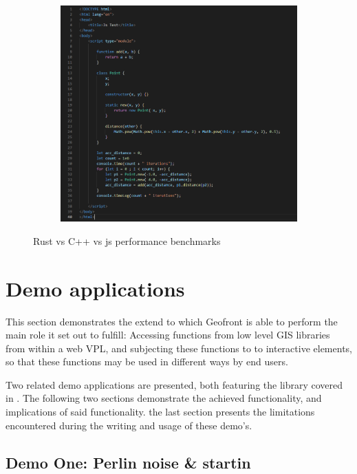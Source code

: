 \begin{figure}
\begin{subfigure}[b]{0.32\linewidth}
    \centering
    \includegraphics[width=\linewidth]{js.PNG}
    \caption{}
  \end{subfigure}%
  \caption[benchmark]{Rust vs C++ vs js performance benchmarks}
  \label{fig:perf-benchmark}
\end{figure}


\section{Demo applications}
\label{sec:testing:demo}
This section demonstrates the extend to which Geofront is able to perform the main role it set out to fulfill: 
Accessing functions from low level \ac{GIS} libraries from within a web VPL, and subjecting these functions to to interactive elements, so that these functions may be used in different ways by end users.

Two related demo applications are presented, both featuring the  library covered in .
The following two sections demonstrate the achieved functionality, and implications of said functionality. 
the last section presents the limitations encountered during the writing and usage of these demo's.

\subsection{Demo One: Perlin noise \& startin}

